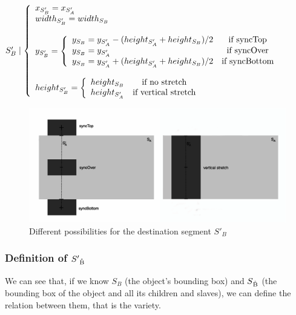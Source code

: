 \documentclass[a4paper]{article}
\begin{document}
$S'_B \mid \left\lbrace 
\begin{array}{lcl} 
x_{S'_B} = x_{S'_A}\\
\bigskip
width_{S'_B} = width_{S_B}\\
\bigskip
y _{S'_B} = \left\lbrace
\begin{array}{lcl}
y_{S_B} = y_{S'_A} - (height_{S'_A} + height_{S_B})/2 & \text{if syncTop}\\ 
y_{S_B} = y_{S'_A} & \text{if syncOver}\\
y_{S_B} = y_{S'_A} + (height_{S'_A} + height_{S_B})/2 & \text{if syncBottom}
\end{array}\right.\\
height _{S'_B} = \left\lbrace
\begin{array}{lcl}
height_{S_B} & \text{if no stretch}\\
height_{S'_A} & \text{if vertical stretch}
\end{array}\right.\\
\end{array}\right.$

\begin{figure}[h]
\begin{center}
\includegraphics[width=15cm]{img/top_over_bottomF.png}
\caption{Different possibilities for the destination segment $S'_B$}
\label{fig:possibleDestRect}
\end{center}
\end{figure}




\subsubsection{Definition of $S'\textsubscript{\r{B}}$}\label{subsubsec:defDestChildRect}

We can see that, if we know $S_B$ (the object's bounding box) and $S\textsubscript{\r{B}}$ (the bounding box of the object and all its children and slaves), we can define the relation between them, that is the variety. 
\end{document}
